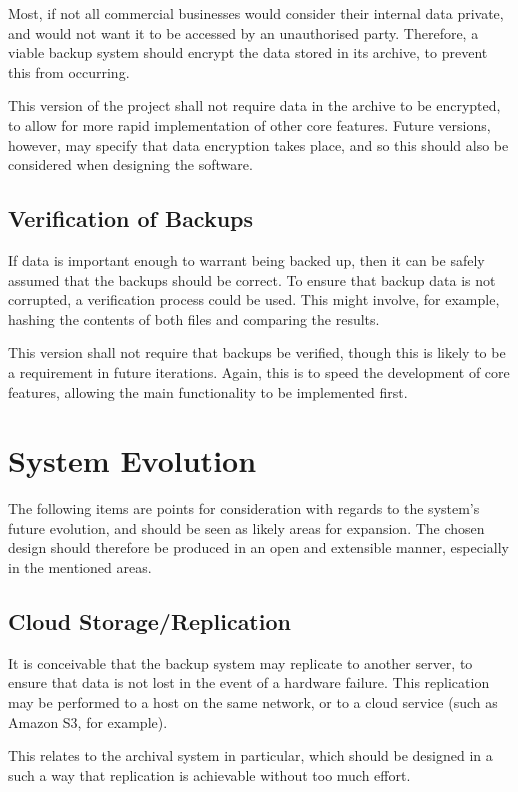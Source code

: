 Most, if not all commercial businesses would consider their internal data
private, and would not want it to be accessed by an unauthorised party.
Therefore, a viable backup system should encrypt the data stored in its
archive, to prevent this from occurring.

This version of the project shall not require data in the archive to be
encrypted, to allow for more rapid implementation of other core features.
Future versions, however, may specify that data encryption takes place, and so
this should also be considered when designing the software.

\subsection{Verification of Backups}

If data is important enough to warrant being backed up, then it can be safely
assumed that the backups should be correct. To ensure that backup data is not
corrupted, a verification process could be used. This might involve, for
example, hashing the contents of both files and comparing the results.

This version shall not require that backups be verified, though this is likely
to be a requirement in future iterations. Again, this is to speed the
development of core features, allowing the main functionality to be implemented
first.

\section{System Evolution}

The following items are points for consideration with regards to the system's
future evolution, and should be seen as likely areas for expansion. The chosen
design should therefore be produced in an open and extensible manner,
especially in the mentioned areas.

\subsection{Cloud Storage/Replication}

It is conceivable that the backup system may replicate to another server, to
ensure that data is not lost in the event of a hardware failure. This
replication may be performed to a host on the same network, or to a cloud
service (such as Amazon S3, for example).

This relates to the archival system in particular, which should be designed in
a such a way that replication is achievable without too much effort.

